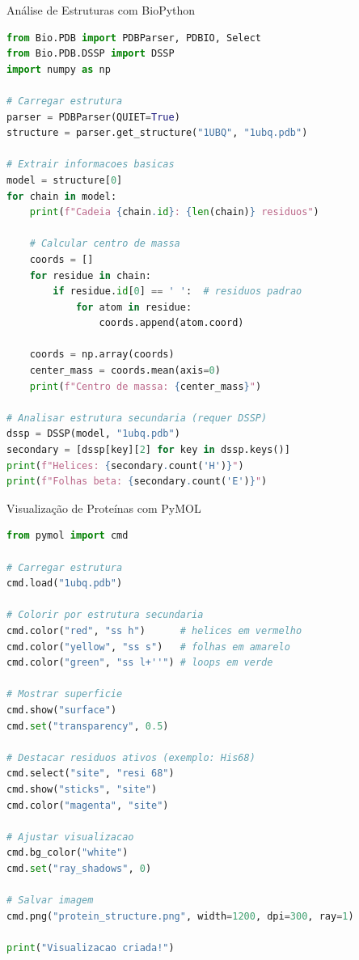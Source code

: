 \begin{frame}[fragile, shrink=10]{Análise de Estruturas com BioPython}
\begin{lstlisting}[language=Python, caption=Parser de arquivos PDB, basicstyle=\ttfamily\tiny]
from Bio.PDB import PDBParser, PDBIO, Select
from Bio.PDB.DSSP import DSSP
import numpy as np

# Carregar estrutura
parser = PDBParser(QUIET=True)
structure = parser.get_structure("1UBQ", "1ubq.pdb")

# Extrair informacoes basicas
model = structure[0]
for chain in model:
    print(f"Cadeia {chain.id}: {len(chain)} residuos")

    # Calcular centro de massa
    coords = []
    for residue in chain:
        if residue.id[0] == ' ':  # residuos padrao
            for atom in residue:
                coords.append(atom.coord)

    coords = np.array(coords)
    center_mass = coords.mean(axis=0)
    print(f"Centro de massa: {center_mass}")

# Analisar estrutura secundaria (requer DSSP)
dssp = DSSP(model, "1ubq.pdb")
secondary = [dssp[key][2] for key in dssp.keys()]
print(f"Helices: {secondary.count('H')}")
print(f"Folhas beta: {secondary.count('E')}")
\end{lstlisting}
\end{frame}

\begin{frame}[fragile, shrink=5]{Visualização de Proteínas com PyMOL}
\begin{lstlisting}[language=Python, caption=Script PyMOL para visualização, basicstyle=\ttfamily\tiny]
from pymol import cmd

# Carregar estrutura
cmd.load("1ubq.pdb")

# Colorir por estrutura secundaria
cmd.color("red", "ss h")      # helices em vermelho
cmd.color("yellow", "ss s")   # folhas em amarelo
cmd.color("green", "ss l+''") # loops em verde

# Mostrar superficie
cmd.show("surface")
cmd.set("transparency", 0.5)

# Destacar residuos ativos (exemplo: His68)
cmd.select("site", "resi 68")
cmd.show("sticks", "site")
cmd.color("magenta", "site")

# Ajustar visualizacao
cmd.bg_color("white")
cmd.set("ray_shadows", 0)

# Salvar imagem
cmd.png("protein_structure.png", width=1200, dpi=300, ray=1)

print("Visualizacao criada!")
\end{lstlisting}
\end{frame}

